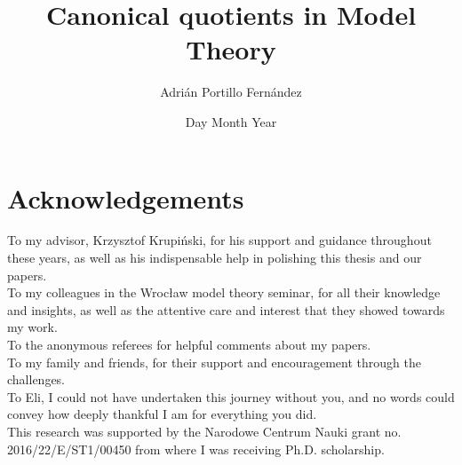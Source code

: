 \documentclass[11pt]{report}
\title{Canonical quotients in Model Theory}
\author{Adrián Portillo Fernández}
\date{Day Month Year}
\newtheorem{external claim}[teor]{Claim}
\begin{document}





\newpage








\chapter*{Acknowledgements}

To my advisor, Krzysztof Krupi\'nski, for his support and guidance throughout these years, as well as his indispensable help in polishing this thesis and our papers.\\

\noindent To my colleagues in the Wroc\l aw model theory seminar, for all their knowledge and insights, as well as the attentive care and interest that they showed towards my work.\\

\noindent To the anonymous referees for helpful comments about my papers.\\

\noindent To my family and friends, for their support and encouragement through the challenges.\\

\noindent To Eli, I could not have undertaken this journey without you, and no words could convey how deeply thankful I am for everything you did.\\

\vfill
\noindent This research was supported by the Narodowe Centrum Nauki grant no. 2016/22/E/ST1/00450 from where I was receiving Ph.D. scholarship.
\end{document}

